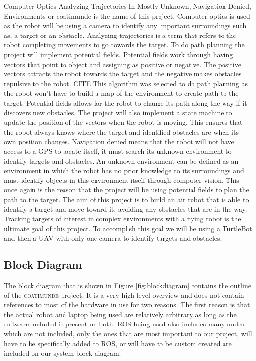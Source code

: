 \documentclass{article}
\begin{document}
	Computer Optics Analyzing Trajectories In Mostly Unknown, Navigation Denied, Environments or coatimunde is the name of this project. 
Computer optics is used as the robot will be using a camera to identify any important surroundings such as, a target or an obstacle. 
Analyzing trajectories is a term that refers to the robot completing movements to go towards the target. To do path planning the project will implement potential fields. Potential fields work through having vectors that point to object and assigning as positive or negative. The positive vectors attracts the robot towards the target and the negative makes obstacles repulsive to the robot. CITE This algorithm was selected to do path planning as the robot won't have to build a map of the environment to create path to the target. Potential fields allows for the robot to change its path along the way if it discovers new obstacles. The project will also implement a state machine to update the position of the vectors when the robot is moving. This ensures that the robot always knows where the target and identified obstacles are when its own position changes. Navigation denied means that the robot will not have access to a GPS to locate itself, it must search its unknown environment to identify targets and obstacles. An unknown environment can be defined as an environment in which the robot has no prior knowledge to its surroundings and must identify objects in this environment itself through computer vision. This once again is the reason that the project will be using potential fields to plan the path to the target. 
	The aim of this project is to build an air robot that is able to identify a target and move toward it, avoiding any obstacles that are in the way. Tracking targets of interest in complex environments with a flying robot is the ultimate goal of this project. To accomplish this goal we will be using a TurtleBot and then a UAV with only one camera to identify targets and obstacles. 


	\subsection{Block Diagram}
	The block diagram that is shown in Figure \ref{fig:blockdiagram} contains the outline of the \textsc{coatimunde} project. It is a very high level overview and does not contain references to most of the hardware in use for two reasons. The first reason is that the actual robot and laptop being used are relatively arbitrary as long as the software included is present on both. ROS being used also includes many nodes which are not included, only the ones that are most important to our project, will have to be specifically added to ROS, or will have to be custom created are included on our system block diagram.
	
\end{document}
